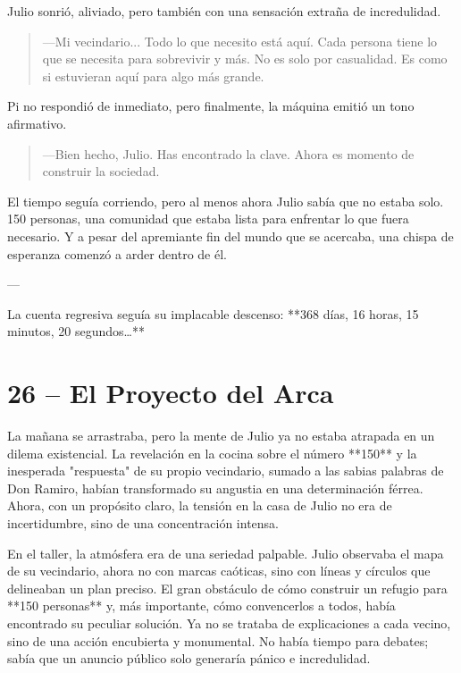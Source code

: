 \documentclass[a4paper,12pt]{book}
\begin{document}
Julio sonrió, aliviado, pero también con una sensación extraña de incredulidad.

\begin{quote}
    —Mi vecindario... Todo lo que necesito está aquí. Cada persona tiene lo que se necesita para sobrevivir y más. No es solo por casualidad. Es como si estuvieran aquí para algo más grande.
\end{quote}

Pi no respondió de inmediato, pero finalmente, la máquina emitió un tono afirmativo.

\begin{quote}
    —Bien hecho, Julio. Has encontrado la clave. Ahora es momento de construir la sociedad.
\end{quote}

El tiempo seguía corriendo, pero al menos ahora Julio sabía que no estaba solo. 150 personas, una comunidad que estaba lista para enfrentar lo que fuera necesario. Y a pesar del apremiante fin del mundo que se acercaba, una chispa de esperanza comenzó a arder dentro de él.

---

La cuenta regresiva seguía su implacable descenso: **368 días, 16 horas, 15 minutos, 20 segundos…**

\cleardoublepage %

\chapter*{26 – El Proyecto del Arca}

La mañana se arrastraba, pero la mente de Julio ya no estaba atrapada en un dilema existencial. La revelación en la cocina sobre el número **150** y la inesperada "respuesta" de su propio vecindario, sumado a las sabias palabras de Don Ramiro, habían transformado su angustia en una determinación férrea. Ahora, con un propósito claro, la tensión en la casa de Julio no era de incertidumbre, sino de una concentración intensa.

En el taller, la atmósfera era de una seriedad palpable. Julio observaba el mapa de su vecindario, ahora no con marcas caóticas, sino con líneas y círculos que delineaban un plan preciso. El gran obstáculo de cómo construir un refugio para **150 personas** y, más importante, cómo convencerlos a todos, había encontrado su peculiar solución. Ya no se trataba de explicaciones a cada vecino, sino de una acción encubierta y monumental. No había tiempo para debates; sabía que un anuncio público solo generaría pánico e incredulidad.
\end{document}
